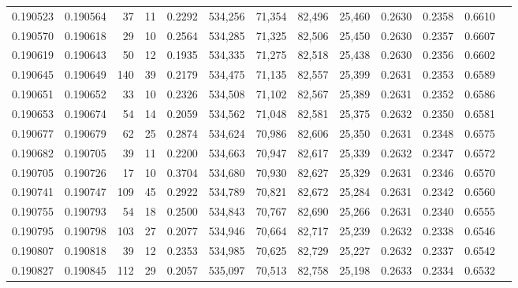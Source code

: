 \begin{tabular}{rrrrrrrrrrrrr}
0.190523 & 0.190564 &    37 &  11 &                                     0.2292 & 534,256 &  71,354 &  82,496 &  25,460 & 0.2630 & 0.2358 & 0.6610 \\
0.190570 & 0.190618 &    29 &  10 &                                     0.2564 & 534,285 &  71,325 &  82,506 &  25,450 & 0.2630 & 0.2357 & 0.6607 \\
0.190619 & 0.190643 &    50 &  12 &                                     0.1935 & 534,335 &  71,275 &  82,518 &  25,438 & 0.2630 & 0.2356 & 0.6602 \\
0.190645 & 0.190649 &   140 &  39 &                                     0.2179 & 534,475 &  71,135 &  82,557 &  25,399 & 0.2631 & 0.2353 & 0.6589 \\
0.190651 & 0.190652 &    33 &  10 &                                     0.2326 & 534,508 &  71,102 &  82,567 &  25,389 & 0.2631 & 0.2352 & 0.6586 \\
0.190653 & 0.190674 &    54 &  14 &                                     0.2059 & 534,562 &  71,048 &  82,581 &  25,375 & 0.2632 & 0.2350 & 0.6581 \\
0.190677 & 0.190679 &    62 &  25 &                                     0.2874 & 534,624 &  70,986 &  82,606 &  25,350 & 0.2631 & 0.2348 & 0.6575 \\
0.190682 & 0.190705 &    39 &  11 &                                     0.2200 & 534,663 &  70,947 &  82,617 &  25,339 & 0.2632 & 0.2347 & 0.6572 \\
0.190705 & 0.190726 &    17 &  10 &                                     0.3704 & 534,680 &  70,930 &  82,627 &  25,329 & 0.2631 & 0.2346 & 0.6570 \\
0.190741 & 0.190747 &   109 &  45 &                                     0.2922 & 534,789 &  70,821 &  82,672 &  25,284 & 0.2631 & 0.2342 & 0.6560 \\
0.190755 & 0.190793 &    54 &  18 &                                     0.2500 & 534,843 &  70,767 &  82,690 &  25,266 & 0.2631 & 0.2340 & 0.6555 \\
0.190795 & 0.190798 &   103 &  27 &                                     0.2077 & 534,946 &  70,664 &  82,717 &  25,239 & 0.2632 & 0.2338 & 0.6546 \\
0.190807 & 0.190818 &    39 &  12 &                                     0.2353 & 534,985 &  70,625 &  82,729 &  25,227 & 0.2632 & 0.2337 & 0.6542 \\
0.190827 & 0.190845 &   112 &  29 &                                     0.2057 & 535,097 &  70,513 &  82,758 &  25,198 & 0.2633 & 0.2334 & 0.6532 \\

\end{tabular}
